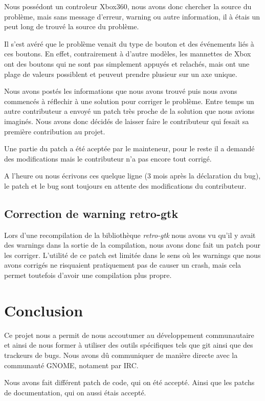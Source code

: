\documentclass[12pt]{report}
\begin{document}
Nous possédont un controleur Xbox360, nous avons donc chercher la source du
problème, mais sans message d'erreur, warning ou autre information, il à
étais un peut long de trouvé la source du problème.

Il s'est avéré que  le problème venait du type de bouton et des événements
liés à ces boutons. En effet, contrairement à d'autre modèles, les mannettes de
Xbox ont des boutons qui ne sont pas simplement appuyés et relachés, mais
ont une plage de valeurs possiblent et peuveut prendre plusieur sur un
axe unique.

Nous avons postés les informations que nous avons trouvé puis nous avons
commencés à réflechir à une solution pour corriger le problème. Entre temps un
autre contributeur a envoyé un patch très proche de la solution que nous
avions imaginés. Nous avons donc décidés de laisser faire le contributeur qui
fesait sa première contribution au projet. %

Une partie du patch a été aceptée par le mainteneur, pour le reste il a
demandé des modifications mais le contributeur n'a pas encore tout corrigé.

A l'heure ou nous écrivons ces quelque ligne (3 mois après la déclaration
du bug), le patch et le bug sont toujours en attente des modifications du
contributeur.

\subsection{Correction de warning retro-gtk}
Lors d'une recompilation de la bibliothèque \textit{retro-gtk} nous avons
vu qu'il y avait des warnings dans la sortie de la compilation, nous
avons donc fait un patch pour les corriger. L'utilité de ce patch est limitée
dans le sens où les warnings que nous avons corrigés ne risquaient
pratiquement pas de causer un crash, mais cela permet toutefois d'avoir une
compilation plus propre.

\newpage
\section{Conclusion}
Ce projet nous a permit de nous accoutumer au développement
communautaire et ainsi de nous former à utiliser des outils
spécifiques tels que git ainsi que des trackeurs de bugs. Nous avons
dû communiquer de manière directe avec la communauté GNOME, notament par IRC.

Nous avons fait différent patch de code, qui on été accepté.
Ainsi que les patchs de documentation, qui on aussi étais accepté.
\end{document}
